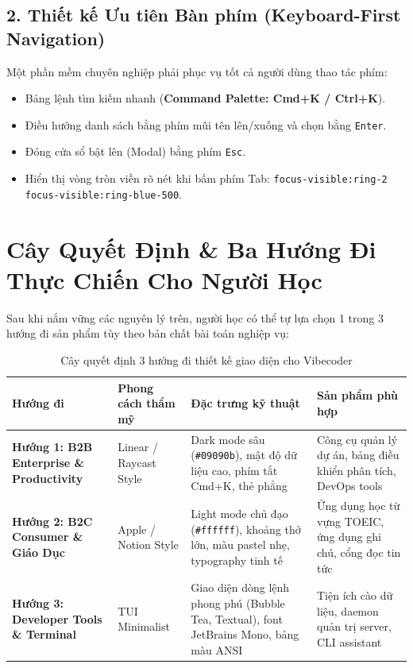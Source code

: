 \documentclass[a4paper,11pt]{article}
\begin{document}
\subsection{2. Thiết kế Ưu tiên Bàn phím (Keyboard-First Navigation)}
Một phần mềm chuyên nghiệp phải phục vụ tốt cả người dùng thao tác phím:
\begin{itemize}[leftmargin=1.5em]
    \item Bảng lệnh tìm kiếm nhanh (\textbf{Command Palette: Cmd+K / Ctrl+K}).
    \item Điều hướng danh sách bằng phím mũi tên lên/xuống và chọn bằng \texttt{Enter}.
    \item Đóng cửa sổ bật lên (Modal) bằng phím \texttt{Esc}.
    \item Hiển thị vòng tròn viền rõ nét khi bấm phím Tab: \texttt{focus-visible:ring-2 focus-visible:ring-blue-500}.
\end{itemize}

\section{Cây Quyết Định \& Ba Hướng Đi Thực Chiến Cho Người Học}

Sau khi nắm vững các nguyên lý trên, người học có thể tự lựa chọn 1 trong 3 hướng đi sản phẩm tùy theo bản chất bài toán nghiệp vụ:

\begin{table}[htbp]
\centering
\small
\caption{Cây quyết định 3 hướng đi thiết kế giao diện cho Vibecoder}
\vspace{0.5em}
\begin{tabularx}{\textwidth}{L{3.2cm} L{3.8cm} L{4.5cm} Y}
\toprule
\textbf{Hướng đi} & \textbf{Phong cách thẩm mỹ} & \textbf{Đặc trưng kỹ thuật} & \textbf{Sản phẩm phù hợp} \\
\midrule
\textbf{Hướng 1: B2B Enterprise \& Productivity} & Linear / Raycast Style & Dark mode sâu (\texttt{\#09090b}), mật độ dữ liệu cao, phím tắt Cmd+K, thẻ phẳng & Công cụ quản lý dự án, bảng điều khiển phân tích, DevOps tools \\
\textbf{Hướng 2: B2C Consumer \& Giáo Dục} & Apple / Notion Style & Light mode chủ đạo (\texttt{\#ffffff}), khoảng thở lớn, màu pastel nhẹ, typography tinh tế & Ứng dụng học từ vựng TOEIC, ứng dụng ghi chú, cổng đọc tin tức \\
\textbf{Hướng 3: Developer Tools \& Terminal} & TUI Minimalist & Giao diện dòng lệnh phong phú (Bubble Tea, Textual), font JetBrains Mono, bảng màu ANSI & Tiện ích cào dữ liệu, daemon quản trị server, CLI assistant \\
\bottomrule
\end{tabularx}
\end{table}
\end{document}

